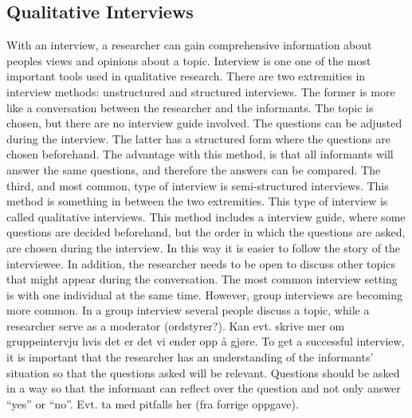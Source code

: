 \subsection{Qualitative Interviews}
With an interview, a researcher can gain comprehensive information about peoples views and opinions about a topic. Interview is one one of the most important tools used in qualitative research. There are two extremities in interview methods: unstructured and structured interviews. The former is more like a conversation between the researcher and the informants. The topic is chosen, but there are no interview guide involved. The questions can be adjusted during the interview. The latter has a structured form where the questions are chosen beforehand. The advantage with this method, is that all informants will answer the same questions, and therefore the answers can be compared. The third, and most common, type of interview is semi-structured interviews. This method is something in between the two extremities. This type of interview is called qualitative interviews. This method includes a interview guide, where some questions are decided beforehand, but the order in which the questions are asked, are chosen during the interview. In this way it is easier to follow the story of the interviewee. In addition, the researcher needs to be open to discuss other topics that might appear during the conversation. The most common interview setting is with one individual at the same time. However, group interviews are becoming more common. In a group interview several people discuss a topic, while a researcher serve as a moderator (ordstyrer?). Kan evt. skrive mer om gruppeintervju hvis det er det vi ender opp å gjøre. To get a successful interview, it is important that the researcher has an understanding of the informants’ situation so that the questions asked will be relevant. Questions should be asked in a way so that the informant can reflect over the question and not only answer “yes” or “no”. 
Evt. ta med pitfalls her (fra forrige oppgave). 

